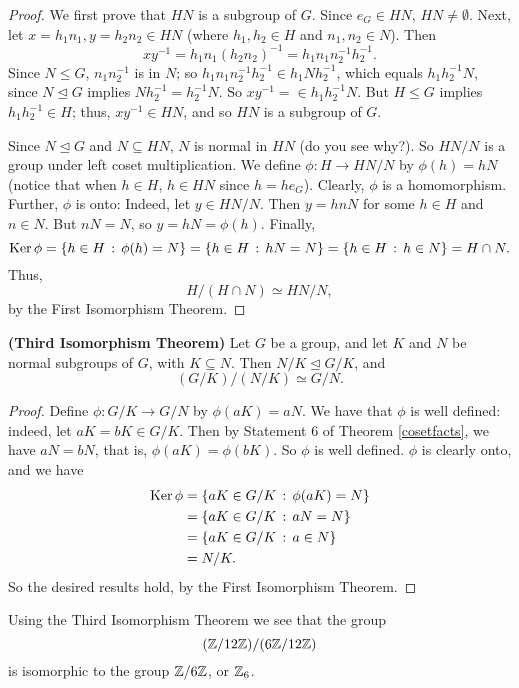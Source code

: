 \begin{proof} We first prove that $HN$ is a subgroup of $G$. Since $e_G\in
HN$, $HN\neq \emptyset$.  Next, let $x=h_1n_1, y=h_2n_2\in HN$
(where $h_1,h_2\in H$ and $n_1,n_2\in N$). Then
$$xy^{-1}=h_1n_1(h_2n_2)^{-1}=h_1n_1n_2^{-1}h_2^{-1}.$$ Since
$N\leq G$, $n_1n_2^{-1}$ is in $N$; so $h_1n_1n_2^{-1}h_2^{-1}\in
h_1Nh_2^{-1}$, which equals $h_1h_2^{-1}N$, since $N\unlhd G$
implies $Nh_2^{-1}=h_2^{-1}N$.  So $xy^{-1}=\in h_1h_2^{-1}N.$ But
$H\leq G$ implies $h_1h_2^{-1}\in H$; thus, $xy^{-1}\in HN$, and so
$HN$ is a subgroup of $G$.

Since $N\unlhd G$ and $N\subseteq HN$, $N$ is normal in $HN$
(do you see why?).  So $HN/N$ is a group under left coset
multiplication. We define $\phi: H\to HN/N$ by $\phi(h)=hN$
(notice that when $h\in H$, $h\in HN$ since $h=he_G$). Clearly,
$\phi$ is a homomorphism. Further, $\phi$ is onto: Indeed, let
$y\in HN/N$.  Then $y=hnN$ for some $h\in H$ and $n\in N$.  But
$nN=N$, so $y=hN=\phi(h)$. Finally,
$$\operatorname{Ker} \phi=\{h\in H\,:\, \phi(h)=N\}=\{h\in H\,:\, hN=N\}=\{h\in
H\,:\, h\in N\}=H\cap N.$$
 Thus,$$H/(H\cap N)
\simeq HN/N,$$ by the First Isomorphism Theorem.\end{proof}


\begin{thm}\label{}\textbf{(Third Isomorphism Theorem)} Let $G$ be a group,
and let $K$ and $N$ be normal subgroups of $G$, with $K\subseteq N$.
Then $N/K \unlhd G/K$, and $$(G/K)/(N/K)\simeq G/N.$$\end{thm}

\begin{proof} Define $\phi: G/K\to G/N$ by $\phi(aK)=aN$. We have that
$\phi$ is well defined: indeed, let $aK=bK \in G/K$. Then by
Statement 6 of Theorem \ref{cosetfacts}, we have $aN=bN$, that
is, $\phi(aK)=\phi(bK)$.  So $\phi$ is well defined.  $\phi$ is
clearly onto, and we have \begin{align*}\operatorname{Ker} \phi&=\{aK\in
G/K\,:\,\phi(aK)=N\}\\&=\{aK\in G/K\,:\,aN=N\}\\&=\{aK\in
G/K\,:\,a\in N\}\\&=N/K.\end{align*}  So the desired
results hold, by the First Isomorphism Theorem.\end{proof}

\begin{example}{} Using the Third Isomorphism Theorem we see that the group
$$(\mathbb{Z}/12\mathbb{Z})/(6\mathbb{Z}/12\mathbb{Z})$$ is isomorphic to the group $\mathbb{Z}/6\mathbb{Z}$, or
$\mathbb{Z}_6$.
\end{example}


